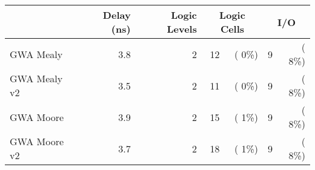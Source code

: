 % 
% 
\begin{tabular}{l|rr|rr|rr}
     & Delay (ns) & Logic Levels & \multicolumn{2}{c|}{Logic Cells} & \multicolumn{2}{c}{I/O} \\
\hline
GWA Mealy   &    3.8 &      2  &    12 & (  0\%)  &     9 & (  8\%)\\ 
GWA Mealy v2   &    3.5 &      2  &    11 & (  0\%)  &     9 & (  8\%)\\ 
GWA Moore   &    3.9 &      2  &    15 & (  1\%)  &     9 & (  8\%)\\ 
GWA Moore v2   &    3.7 &      2  &    18 & (  1\%)  &     9 & (  8\%)\\ 
\end{tabular}
